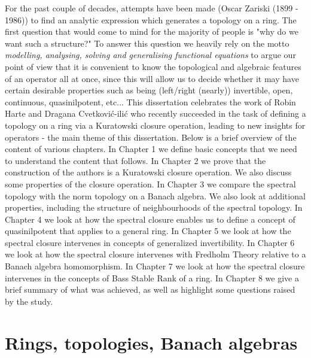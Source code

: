 \documentclass[12pt, oneside]{book}
\begin{document}
\vskip 0.3cm
\noindent For the past couple of decades, attempts have been made (Oscar Zariski (1899 - 1986)) to find an analytic expression which generates a topology on a ring. The first question that would come to mind for the majority of people is "why do we want such a structure?"
\vskip 0.3cm
\noindent To answer this question we heavily rely on the motto \textit{modelling, analysing, solving and generalising functional equations} to argue our point of view that it is convenient to know the topological and algebraic features of an operator all at once, since this will allow us to decide whether it may have certain desirable properties such as being (left/right (nearly)) invertible, open, continuous, quasinilpotent, etc...
\vskip 0.3cm
\noindent This dissertation celebrates the work of Robin Harte and Dragana Cvetkovi\'c-ili\'c who recently succeeded in the task of defining a topology on a ring via a Kuratowski closure operation, leading to new insights for operators - the main theme of this dissertation. 
Below is a brief overview of the content of various chapters.
\vskip 0.3cm
\noindent In Chapter 1 we define basic concepts that we need to understand the content that follows.
\vskip 0.3cm
\noindent In Chapter 2 we prove that the construction of the authors is a Kuratowski closure operation. We also discuss some properties of the closure operation. 
\vskip 0.3cm
\noindent In Chapter 3 we compare the spectral topology with the norm topology on a Banach algebra. We also look at additional properties, including the structure of neighbourhoods of the spectral topology.
\vskip 0.3cm
\noindent In Chapter 4 we look at how the spectral closure enables us to define a concept 
of quasinilpotent that applies to a general ring.
\vskip 0.3cm
\noindent In Chapter 5 we look at how the spectral closure intervenes in concepts of generalized
 invertibility.
\vskip 0.3cm
\noindent In Chapter 6 we look at how the spectral closure intervenes with Fredholm Theory relative to 
a Banach algebra homomorphism.
\vskip 0.3cm
\noindent In Chapter 7 we look at how the spectral closure intervenes in the concepts of 
Bass Stable Rank of a ring. 
\vskip 0.3cm
\noindent In Chapter 8 we give a brief summary of what was achieved, as well as highlight some questions raised by the study.
\vskip 2cm
\begin{center}
\maltese
\end{center}

\chapter{Rings, topologies, Banach algebras} \label{chapter 1}
\end{document}
